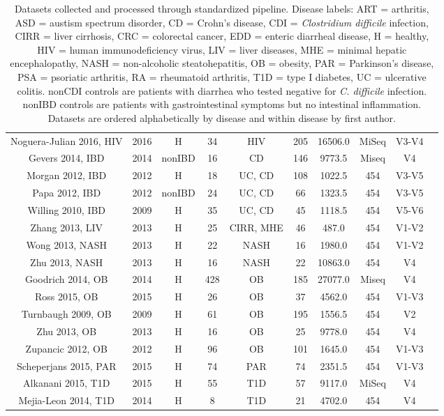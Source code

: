 \documentclass{article}
\begin{document}
{{\begin{table}[h]
{\begin{tabular}{c c c c c c c c c c}
	Noguera-Julian 2016, HIV & 2016 & H & 34 & HIV & 205 & 16506.0 & MiSeq & V3-V4 & \cite{noguera2016gut} \\ 
	Gevers 2014, IBD & 2014 & nonIBD & 16 & CD & 146 & 9773.5 & Miseq & V4 & \cite{ibd-gevers} \\ 
	Morgan 2012, IBD & 2012 & H & 18 & UC, CD & 108 & 1022.5 & 454 & V3-V5 & \cite{ibd-hut} \\ 
	Papa 2012, IBD & 2012 & nonIBD & 24 & UC, CD & 66 & 1323.5 & 454 & V3-V5 & \cite{ibd-papa} \\ 
	Willing 2010, IBD & 2009 & H & 35 & UC, CD & 45 & 1118.5 & 454 & V5-V6 & \cite{ibd-engstrand} \\ 
	Zhang 2013, LIV & 2013 & H & 25 & CIRR, MHE & 46 & 487.0 & 454 & V1-V2 & \cite{mhe-zhang} \\ 
	Wong 2013, NASH & 2013 & H & 22 & NASH & 16 & 1980.0 & 454 & V1-V2 & \cite{nash-chan} \\ 
	Zhu 2013, NASH & 2013 & H & 16 & NASH & 22 & 10863.0 & 454 & V4 & \cite{nash-baker} \\ 
	Goodrich 2014, OB & 2014 & H & 428 & OB & 185 & 27077.0 & Miseq & V4 & \cite{ob-goodrich} \\ 
	Ross 2015, OB & 2015 & H & 26 & OB & 37 & 4562.0 & 454 & V1-V3 & \cite{ob-ross} \\ 
	Turnbaugh 2009, OB & 2009 & H & 61 & OB & 195 & 1556.5 & 454 & V2 & \cite{ob-gordon} \\ 
	Zhu 2013, OB & 2013 & H & 16 & OB & 25 & 9778.0 & 454 & V4 & \cite{nash-baker} \\ 
	Zupancic 2012, OB & 2012 & H & 96 & OB & 101 & 1645.0 & 454 & V1-V3 & \cite{ob-zupancic} \\ 
	Scheperjans 2015, PAR & 2015 & H & 74 & PAR & 74 & 2351.5 & 454 & V1-V3 & \cite{par-schep} \\ 
	Alkanani 2015, T1D & 2015 & H & 55 & T1D & 57 & 9117.0 & MiSeq & V4 & \cite{t1d-alkanani} \\ 
	Mejia-Leon 2014, T1D & 2014 & H & 8 & T1D & 21 & 4702.0 & 454 & V4 & \cite{t1d-mejia} \\ 	\hline
\end{tabular}}
\caption{Datasets collected and processed through standardized pipeline. Disease labels: ART = arthritis, ASD = austism spectrum disorder, CD = Crohn's disease, CDI = \textit{Clostridium difficile} infection, CIRR = liver cirrhosis, CRC = colorectal cancer, EDD = enteric diarrheal disease, H = healthy, HIV = human immunodeficiency virus, LIV = liver diseases,  MHE =  minimal hepatic encephalopathy, NASH = non-alcoholic steatohepatitis, OB = obesity, PAR = Parkinson's disease, PSA = psoriatic arthritis, RA = rheumatoid arthritis, T1D = type I diabetes, UC = ulcerative colitis. nonCDI controls are patients with diarrhea who tested negative for \textit{C. difficile} infection. nonIBD controls are patients  with gastrointestinal symptoms but no intestinal inflammation. Datasets are ordered alphabetically by disease and within disease by first author.}\label{tab:datasets_full_info}
\end{table}
}

}
\end{document}
